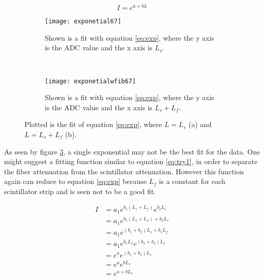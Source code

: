 \begin{equation}
    I = e^{a + bL}
    \label{eq:exp}
\end{equation}

\begin{figure}[h]
    \centering
    \begin{subfigure}[h]{0.4\textwidth}
        \texttt{[image: exponetial67]}
        \caption{Shown is a fit with equation \ref{eq:exp}, where the y axis is the ADC value and the x axis is $L_{s}$.}
        \label{fig:exponential67}
    \end{subfigure}
    ~
    \begin{subfigure}[h]{0.4\textwidth}
        \texttt{[image: exponetialwfib67]}
        \caption{Shown is a fit with equation \ref{eq:exp}, where the y axis is the ADC value and the x axis is $L_{s} + L_{f}$.}
        \label{fig:exponentialwfib67}
    \end{subfigure}
    \caption{Plotted is the fit of equation \ref{eq:exp}, where $L = L_{s}$ (a) and $L = L_{s} + L_{f}$ (b).}
    \label{fig:expfit}
\end{figure}

As seen by figure \ref{fig:expfit}, a single exponential may not be the best fit for the data.
One might suggest a fitting function similar to equation \ref{eq:try1}, in order to separate the fiber attenuation from the scintillator attenuation.
However this function again can reduce to equation \ref{eq:exp} because $L_{f}$ is a constant for each scintillator strip and is seen not to be a good fit.


\begin{equation}
    \begin{split}
        I &= a_{1}e^{b_{1}(L_{s} + L_{f})}e^{b_{2}L_{s}} \\
          &= a_{1}e^{b_{1}(L_{s} + L_{f}) + b_{2}L_{s}} \\
          &= a_{1}e^{(b_{1} + b_{2})L_{s} + b_{1}L_{f}} \\
          &= a_{1}e^{b_{1}L_{f}}e^{(b_{1} + b_{2})L_{s}} \\
          &= e^{a}e^{(b_{1} + b_{2})L_{s}} \\
          &= e^{a}e^{bL_{s}} \\
          &= e^{a + bL_{s}} \\
    \end{split}
    \label{eq:try1}
\end{equation}

